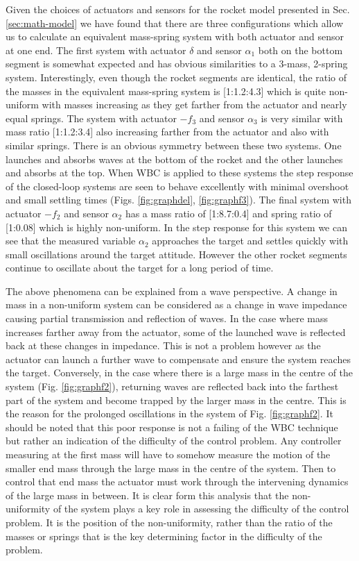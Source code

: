 \documentclass{mbd_fullpaper}
\begin{document}
Given the choices of actuators and sensors for the rocket model presented in Sec. \ref{sec:math-model} we have found that there are three configurations which allow us to calculate an equivalent mass-spring system with both actuator and sensor at one end.
The first system with actuator $\delta$ and sensor $\alpha_1$ both on the bottom segment is somewhat expected and has obvious similarities to a 3-mass, 2-spring system.
Interestingly, even though the rocket segments are identical, the ratio of the masses in the equivalent mass-spring system is [1:1.2:4.3] which is quite non-uniform with masses increasing as they get farther from the actuator and nearly equal springs.
The system with actuator $-f_3$ and sensor $\alpha_3$ is very similar with mass ratio [1:1.2:3.4] also increasing farther from the actuator and also with similar springs.
There is an obvious symmetry between these two systems.
One launches and absorbs waves at the bottom of the rocket and the other launches and absorbs at the top. 
When WBC is applied to these systems the step response of the closed-loop systems are seen to behave excellently with minimal overshoot and small settling times (Figs. \ref{fig:graphdel}, \ref{fig:graphf3}).
The final system with actuator $-f_2$ and sensor $\alpha_2$ has a mass ratio of [1:8.7:0.4] and spring ratio of [1:0.08] which is highly non-uniform.
In the step response for this system we can see that the measured variable $\alpha_2$ approaches the target and settles quickly with small oscillations around the target attitude.
However the other rocket segments continue to oscillate about the target for a long period of time.

The above phenomena can be explained from a wave perspective.
A change in mass in a non-uniform system can be considered as a change in wave impedance causing partial transmission and reflection of waves.
In the case where mass increases farther away from the actuator, some of the launched wave is reflected back at these changes in impedance.
This is not a problem however as the actuator can launch a further wave to compensate and ensure the system reaches the target.
Conversely, in the case where there is a large mass in the centre of the system (Fig. \ref{fig:graphf2}), returning waves are reflected back into the farthest part of the system and become trapped by the larger mass in the centre.
This is the reason for the prolonged oscillations in the system of Fig. \ref{fig:graphf2}.
It should be noted that this poor response is not a failing of the WBC technique but rather an indication of the difficulty of the control problem.
Any controller measuring at the first mass will have to somehow measure the motion of the smaller end mass through the large mass in the centre of the system.
Then to control that end mass the actuator must work through the intervening dynamics of the large mass in between.
It is clear form this analysis that the non-uniformity of the system plays a key role in assessing the difficulty of the control problem.
It is the position of the non-uniformity, rather than the ratio of the masses or springs that is the key determining factor in the difficulty of the problem.
\end{document}
